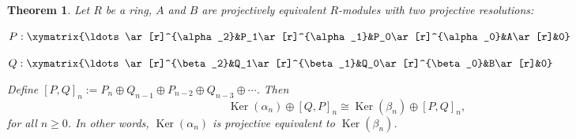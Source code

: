 \documentclass[12pt]{article}
\newtheorem{thm}{Theorem}
\newcommand{\kernel}{\operatorname{Ker}}
\begin{document}
\begin{thm} Let $R$ be a ring, $A$ and $B$ are projectively equivalent $R$-modules with two projective resolutions:
\begin{center}
$P:\xymatrix{\ldots \ar[r]^{\alpha_2}&P_1\ar[r]^{\alpha_1}&P_0\ar[r]^{\alpha_0}&A\ar[r]&0}$
\end{center}
\begin{center}
$Q:\xymatrix{\ldots \ar[r]^{\beta_2}&Q_1\ar[r]^{\beta_1}&Q_0\ar[r]^{\beta_0}&B\ar[r]&0}$
\end{center}
Define $[P,Q]_n:=P_n\oplus Q_{n-1}\oplus P_{n-2}\oplus Q_{n-3}\oplus\cdots$.  Then $$\kernel(\alpha_n)\oplus[Q,P]_n\cong\kernel(\beta_n)\oplus[P,Q]_n,$$
for all $n\geq0$.  In other words, $\kernel(\alpha_n)$ is projective equivalent to $\kernel(\beta_n)$.
\end{thm}
\end{document}
